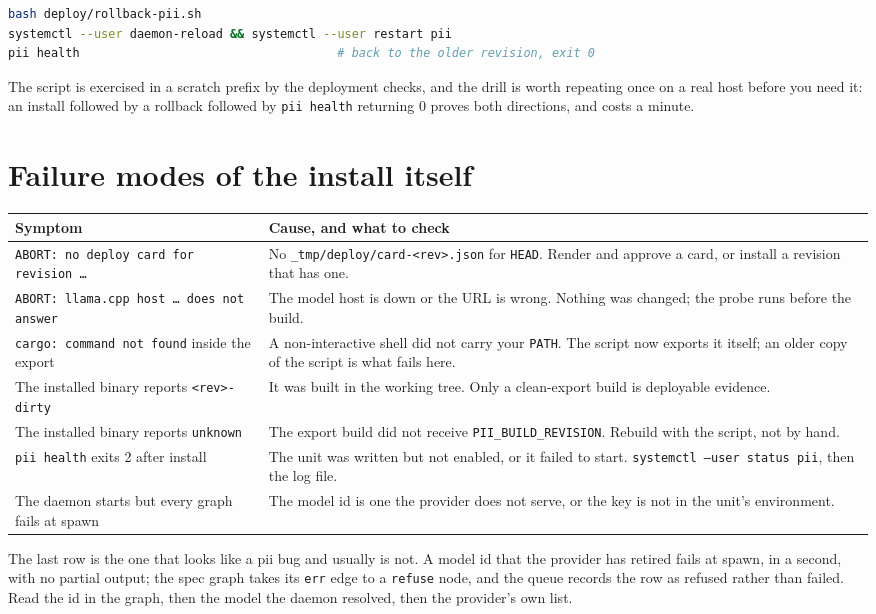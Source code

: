 \begin{lstlisting}[language=bash]
bash deploy/rollback-pii.sh
systemctl --user daemon-reload && systemctl --user restart pii
pii health                                    # back to the older revision, exit 0
\end{lstlisting}

The script is exercised in a scratch prefix by the deployment checks, and the drill is
worth repeating once on a real host before you need it: an install followed by a rollback
followed by \texttt{pii health} returning 0 proves both directions, and costs a minute.

\section{Failure modes of the install itself}

\begin{center}
\begin{tabular}{@{}p{}p{}@{}}
	\toprule
	\textbf{Symptom} & \textbf{Cause, and what to check} \\
	\midrule
	\texttt{ABORT: no deploy card for revision \ldots} & No
        \texttt{\_tmp/deploy/card-\textless{}rev\textgreater{}.json} for \texttt{HEAD}. Render
and approve a card, or
	install a revision that has one. \\
	\texttt{ABORT: llama.cpp host \ldots\ does not answer} & The model host is down or the
	URL is wrong. Nothing was changed; the probe runs before the build. \\
	\texttt{cargo: command not found} inside the export & A non-interactive shell did not
	carry your \texttt{PATH}. The script now exports it itself; an older copy of the script
	is what fails here. \\
        The installed binary reports \texttt{\textless{}rev\textgreater{}-dirty} & It was built
in the working tree.
	Only a clean-export build is deployable evidence. \\
	The installed binary reports \texttt{unknown} & The export build did not receive
	\texttt{PII\_BUILD\_REVISION}. Rebuild with the script, not by hand. \\
	\texttt{pii health} exits 2 after install & The unit was written but not enabled, or it
	failed to start. \texttt{systemctl --user status pii}, then the log file. \\
	The daemon starts but every graph fails at spawn & The model id is one the provider does
	not serve, or the key is not in the unit's environment. \\
	\bottomrule
\end{tabular}
\end{center}

The last row is the one that looks like a pii bug and usually is not. A model id that the
provider has retired fails at spawn, in a second, with no partial output; the spec graph
takes its \texttt{err} edge to a \texttt{refuse} node, and the queue records the row as
refused rather than failed. Read the id in the graph, then the model the daemon resolved,
then the provider's own list.
